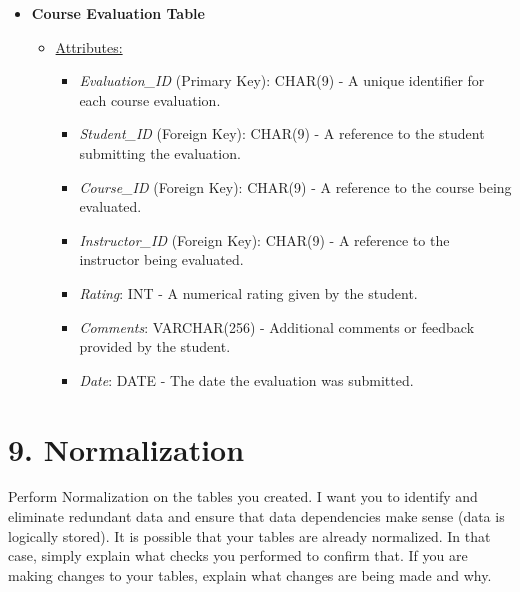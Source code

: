 \documentclass[12pt]{article}
\begin{document}
\begin{itemize}
    \item \textbf{Course Evaluation Table}
    \begin{itemize}
        \item \underline{Attributes:}
        \begin{itemize}
            \item \textit{Evaluation\_ID} (Primary Key): CHAR(9) - A unique identifier for each course evaluation.
            \item \textit{Student\_ID} (Foreign Key): CHAR(9) - A reference to the student submitting the evaluation.
            \item \textit{Course\_ID} (Foreign Key): CHAR(9) - A reference to the course being evaluated.
            \item \textit{Instructor\_ID} (Foreign Key): CHAR(9) - A reference to the instructor being evaluated.
            \item \textit{Rating}: INT - A numerical rating given by the student.
            \item \textit{Comments}: VARCHAR(256) - Additional comments or feedback provided by the student.
            \item \textit{Date}: DATE - The date the evaluation was submitted.
        \end{itemize}
    \end{itemize}
    
\end{itemize}


\pagebreak

\section*{9. Normalization}

Perform Normalization on the tables you created. I want you to identify and eliminate redundant data and ensure that data dependencies make sense (data is logically stored).
It is possible that your tables are already normalized. In that case, simply explain what checks you performed to confirm that. 
If you are making changes to your tables, explain what changes are being made and why.
\end{document}
